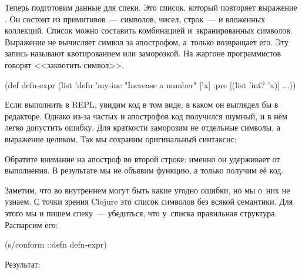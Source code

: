 \fi


Теперь подготовим данные для спеки. Это список, который повторяет выражение
. Он состоит из примитивов~--- символов, чисел, строк~--- и вложенных
коллекций. Список можно составить комбинацией  и~экранированных
символов. Выражение  не вычисляет символ за апострофом,
а~только возвращает его. Эту запись называют квотированием  или
заморозкой. На жаргоне программистов говорят <<заквотить символ>>.

\begin{clojure}
(def defn-expr
  (list 'defn 'my-inc
        "Increase a number"
        ['x]
        {:pre [(list 'int? 'x)]} ...))
\end{clojure}

Если выполнить  в REPL, увидим код в том виде, в каком он
выглядел бы в редакторе. Однако из-за частых  и апострофов код
получился шумный, и в нём легко допустить ошибку. Для краткости заморозим не
отдельные символы, а выражение  целиком. Так мы сохраним оригинальный
синтаксис:


Обратите внимание на апостроф во второй строке: именно он удерживает 
от выполнения. В результате мы не объявим функцию, а только получим её код.

Заметим, что во внутреннем  могут быть какие угодно ошибки, но мы
о~них не узнаем. С точки зрения Clojure это список символов без всякой
семантики. Для этого мы и пишем спеку~--- убедиться, что у~списка правильная
структура. Распарсим его:

\begin{clojure}
(s/conform ::defn defn-expr)
\end{clojure}

\noindent
Результат:

\iflarge\vspace{15mm}\pagebreak[4]\fi

\ifnarrow


